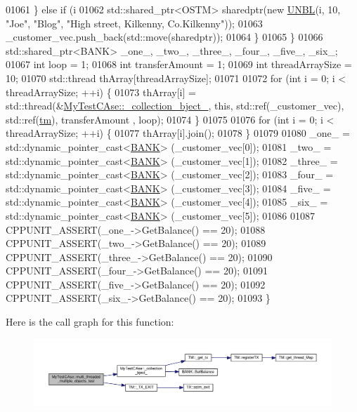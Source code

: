 \begin{DoxyCode}
01061         \} \textcolor{keywordflow}{else} \textcolor{keywordflow}{if} (i %
01062             std::shared\_ptr<OSTM> sharedptr(\textcolor{keyword}{new} \hyperlink{class_u_n_b_l}{UNBL}(i, 10, \textcolor{stringliteral}{"Joe"}, \textcolor{stringliteral}{"Blog"}, \textcolor{stringliteral}{"High street, Kilkenny,
       Co.Kilkenny"}));
01063             \_customer\_vec.push\_back(std::move(sharedptr));
01064         \}
01065     \}
01066     std::shared\_ptr<BANK> \_one\_, \_two\_, \_three\_, \_four\_, \_five\_, \_six\_;
01067     \textcolor{keywordtype}{int} loop = 1;
01068     \textcolor{keywordtype}{int} transferAmount = 1;
01069     \textcolor{keywordtype}{int} threadArraySize = 10; 
01070     std::thread thArray[threadArraySize];
01071 
01072     \textcolor{keywordflow}{for} (\textcolor{keywordtype}{int} i = 0; i < threadArraySize; ++i) \{ 
01073         thArray[i] = std::thread(&\hyperlink{class_my_test_c_ase_a9ec1ddfc6e7f727446e1a8355086c2dd_a9ec1ddfc6e7f727446e1a8355086c2dd}{MyTestCAse::\_collection\_bject\_}, \textcolor{keyword}{this}, 
      std::ref(\_customer\_vec),  std::ref(\hyperlink{class_my_test_c_ase_a422e6e5d4ddedea384be96031c89b72b_a422e6e5d4ddedea384be96031c89b72b}{tm}), transferAmount , loop);
01074     \}
01075     
01076     \textcolor{keywordflow}{for} (\textcolor{keywordtype}{int} i = 0; i < threadArraySize; ++i) \{
01077         thArray[i].join();
01078     \}
01079     
01080     \_one\_ = std::dynamic\_pointer\_cast<\hyperlink{class_b_a_n_k}{BANK}> (\_customer\_vec[0]);
01081     \_two\_ = std::dynamic\_pointer\_cast<\hyperlink{class_b_a_n_k}{BANK}> (\_customer\_vec[1]);
01082     \_three\_ = std::dynamic\_pointer\_cast<\hyperlink{class_b_a_n_k}{BANK}> (\_customer\_vec[2]);
01083     \_four\_ = std::dynamic\_pointer\_cast<\hyperlink{class_b_a_n_k}{BANK}> (\_customer\_vec[3]);
01084     \_five\_ = std::dynamic\_pointer\_cast<\hyperlink{class_b_a_n_k}{BANK}> (\_customer\_vec[4]);
01085     \_six\_ = std::dynamic\_pointer\_cast<\hyperlink{class_b_a_n_k}{BANK}> (\_customer\_vec[5]);
01086  
01087     CPPUNIT\_ASSERT(\_one\_->GetBalance() == 20);
01088     CPPUNIT\_ASSERT(\_two\_->GetBalance() == 20);
01089     CPPUNIT\_ASSERT(\_three\_->GetBalance() == 20);
01090     CPPUNIT\_ASSERT(\_four\_->GetBalance() == 20);
01091     CPPUNIT\_ASSERT(\_five\_->GetBalance() == 20);
01092     CPPUNIT\_ASSERT(\_six\_->GetBalance() == 20);
01093 \}\end{DoxyCode}


Here is the call graph for this function\+:
\nopagebreak
\begin{figure}[H]
\begin{center}
\leavevmode
\includegraphics[width=350pt]{class_my_test_c_ase_ae49b83ddf0fa297dbb8639001644fa5c_ae49b83ddf0fa297dbb8639001644fa5c_cgraph}
\end{center}
\end{figure}


